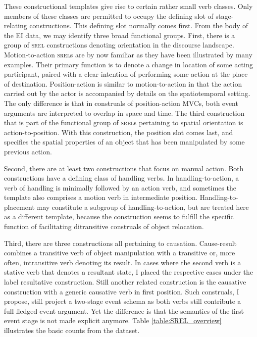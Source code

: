 These constructional templates give rise to certain rather small verb classes. Only members of these classes are permitted to occupy the defining slot of stage-relating constructions. This defining slot normally comes first. From the body of the EI data, we may identify three broad functional groups. First, there is a group of \textsc{srel} constructions denoting orientation in the discourse landscape. Motion-to-action \textsc{srel}s are by now familiar as they have been illustrated by many examples. Their primary function is to denote a change in location of some acting participant, paired with a clear intention of performing some action at the place of destination. Position-action is similar to motion-to-action in that the action carried out by the actor is accompanied by details on the spatiotemporal setting. The only difference is that in construals of position-action MVCs, both event arguments are interpreted to overlap in space and time. The third construction that is part of the functional group of \textsc{srel}s pertaining to spatial orientation is action-to-position. With this construction, the position slot comes last, and specifies the spatial properties of an object that has been manipulated by some previous action. 

Second, there are at least two constructions that focus on manual action. Both constructions have a defining class of handling verbs. In handling-to-action, a verb of handling is minimally followed by an action verb, and sometimes the template also comprises a motion verb in intermediate position. Handling-to-placement may constitute a subgroup of handling-to-action, but are treated here as a different template, because the construction seems to fulfill the specific function of facilitating ditransitive construals of object relocation.

Third, there are three constructions all pertaining to causation. Cause-result combines a transitive verb of object manipulation with a transitive or, more often, intransitive verb denoting its result. In cases where the second verb is a stative verb that denotes a resultant state, I placed the respective cases under the label resultative construction. Still another related construction is the causative construction with a generic causative verb in first position. Such construals, I propose, still project a two-stage event schema as both verbs still contribute a full-fledged event argument. Yet the difference is that the semantics of the first event stage is not made explicit anymore. Table \ref{table:SREL_overview} illustrates the basic counts from the dataset.

